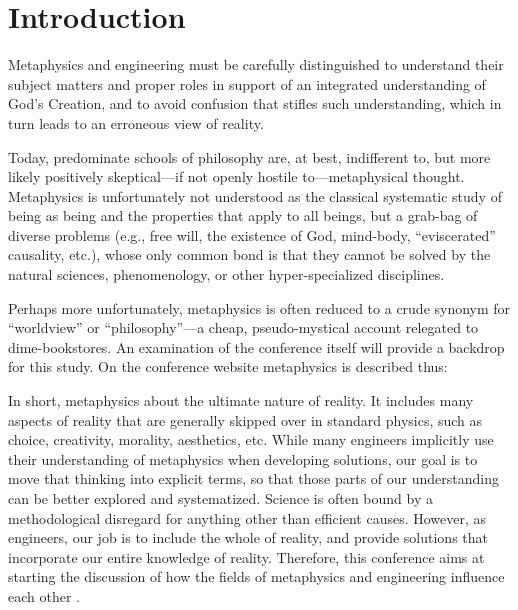 \section{Introduction}



Metaphysics and engineering must be carefully distinguished to understand their subject matters and proper roles in support of an integrated understanding of God's Creation, and to avoid confusion that stifles such understanding, which in turn leads to an erroneous view of reality.

Today, predominate schools of philosophy are, at best, indifferent to, but more likely positively skeptical---if not openly hostile to---metaphysical thought. Metaphysics is unfortunately not understood as the classical systematic study of being as being and the properties that apply to all beings, but a grab-bag of diverse problems (e.g., free will, the existence of God, mind-body, ``eviscerated'' causality, etc.), whose only common bond is that they cannot be solved by the natural sciences, phenomenology, or other hyper-specialized disciplines.

Perhaps more unfortunately, metaphysics is often reduced to a crude synonym for ``worldview'' or ``philosophy''---a cheap, pseudo-mystical account relegated to dime-bookstores. An examination of the conference itself will provide a backdrop for this study.  On the conference website metaphysics is described thus:

\begin{quoting}
In short, metaphysics  about the ultimate nature of reality. It includes many aspects of reality that are generally skipped over in standard physics, such as choice, creativity, morality, aesthetics, etc. While many engineers implicitly use their understanding of metaphysics when developing solutions, our goal is to move that thinking into explicit terms, so that those parts of our understanding can be better explored and systematized. Science is often bound by a methodological disregard for anything other than efficient causes. However, as engineers, our job is to include the whole of reality, and provide solutions that incorporate our entire knowledge of reality. Therefore, this conference aims at starting the discussion of how the fields of metaphysics and engineering influence each other \citep{aboutconference}.
\end{quoting}

